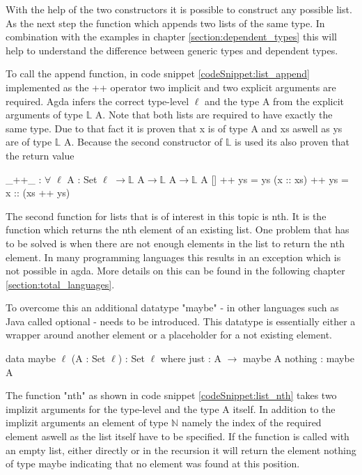 With the help of the two constructors it is possible to construct any possible list. As the next step the function which appends two lists of the same type. In combination with the examples in chapter \ref{section:dependent_types} this will help to understand the difference between generic types and dependent types.

To call the append function, in code snippet \ref{codeSnippet:list_append} implemented as the ++ operator two implicit and two explicit arguments are required. 
Agda infers the correct type-level $\ell$ and the type A from the explicit arguments of type $\mathbb{L}$ A. Note that both lists are required to have exactly the same type.
Due to that fact it is proven that x is of type A and xs aswell as ys are of type $\mathbb{L}$ A. Because the second constructor of $\mathbb{L}$ is used its also proven that the return value 
\begin{codesnippet}[mathescape=true, caption={Definition list append function in Agda}, label={codeSnippet:list_append}]
_++_ : $\forall$ {$\ell$} {A : Set $\ell$} $\rightarrow \mathbb{L}$ A$\rightarrow \mathbb{L}$ A$\rightarrow \mathbb{L}$ A
  []        ++ ys = ys
  (x :: xs) ++ ys = x :: (xs ++ ys)
\end{codesnippet}

The second function for lists that is of interest in this topic is nth. It is the function which returns the nth element of an existing list.
One problem that has to be solved is when there are not enough elements in the list to return the nth element. 
In many programming languages this results in an exception which is not possible in agda.
More details on this can be found in the following chapter \ref{section:total_languages}.

To overcome this an additional datatype "maybe" - in other languages such as Java called optional - needs to be introduced.
This datatype is essentially either a wrapper around another element or a placeholder for a not existing element.
\begin{codesnippet}[mathescape=true, caption={Definition of the maybe datatype in Agda}, label={codeSnippet:maybe_datatype}]
data maybe {$\ell$} (A : Set $\ell$) : Set $\ell$ where
  just : A $\rightarrow$ maybe A
  nothing : maybe A
\end{codesnippet}

The function "nth" as shown in code snippet \ref{codeSnippet:list_nth} takes two implizit arguments for the type-level and the type A itself.
In addition to the implizit arguments an element of type $\mathbb{N}$ namely the index of the required element aswell as the list itself have to be specified.
If the function is called with an empty list, either directly or in the recursion it will return the element nothing of type maybe indicating that no element was found at this position.

